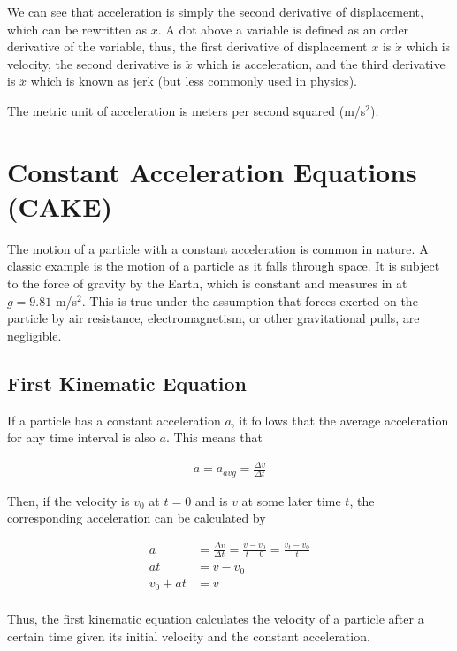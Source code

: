 \documentclass[11pt]{report}
\begin{document}
We can see that acceleration is simply the second derivative of displacement, which can be rewritten as $\ddot{x}$. A dot above a variable is defined as an order derivative of the variable, thus, the first derivative of displacement $x$ is $\dot{x}$ which is velocity, the second derivative is $\ddot{x}$ which is acceleration, and the third derivative is $\dddot{x}$ which is known as jerk (but less commonly used in physics).

The metric unit of acceleration is meters per second squared (m/s$^{2}$).


\section{Constant Acceleration Equations (CAKE)}

The motion of a particle with a constant acceleration is common in nature. A classic example is the motion of a particle as it falls through space. It is subject to the force of gravity by the Earth, which is constant and measures in at $g = 9.81$  m/s$^{2}$. This is true under the assumption that forces exerted on the particle by air resistance, electromagnetism, or other gravitational pulls, are negligible. 

\subsection{First Kinematic Equation}

If a particle has a constant acceleration $a$, it follows that the average acceleration for any time interval is also $a$. This means that

\begin{align*}
    a = a_{avg} = \frac{\Delta v}{\Delta t}
\end{align*}

Then, if the velocity is $v_{0}$ at $t = 0$ and is $v$ at some later time $t$, the corresponding acceleration can be calculated by

\begin{align*}
    a &= \frac{\Delta v}{\Delta t} = \frac{v - v_{0}}{t - 0} = \frac{v_{t} - v_{0}}{t} \\
    at &= v - v_{0} \\
    v_{0} + at &= v \\
\end{align*}

Thus, the first kinematic equation calculates the velocity of a particle after a certain time given its initial velocity and the constant acceleration.
\end{document}
